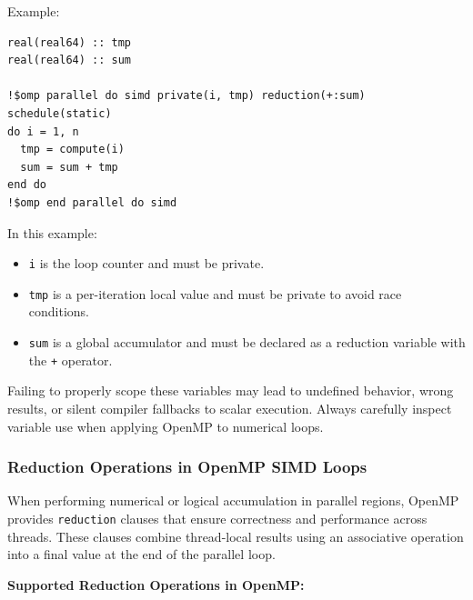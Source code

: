 \documentclass{article}
\begin{document}
\noindent
Example:
\begin{verbatim}
real(real64) :: tmp
real(real64) :: sum

!$omp parallel do simd private(i, tmp) reduction(+:sum) schedule(static)
do i = 1, n
  tmp = compute(i)
  sum = sum + tmp
end do
!$omp end parallel do simd
\end{verbatim}

In this example:
\begin{itemize}
  \item \texttt{i} is the loop counter and must be private.
  \item \texttt{tmp} is a per-iteration local value and must be private to avoid race conditions.
  \item \texttt{sum} is a global accumulator and must be declared as a reduction variable with the \texttt{+} operator.
\end{itemize}

Failing to properly scope these variables may lead to undefined behavior, wrong results, or silent compiler fallbacks to scalar execution. Always carefully inspect variable use when applying OpenMP to numerical loops.

\subsubsection{Reduction Operations in OpenMP SIMD Loops}

When performing numerical or logical accumulation in parallel regions, OpenMP provides \texttt{reduction} clauses that ensure correctness and performance across threads. These clauses combine thread-local results using an associative operation into a final value at the end of the parallel loop.

\vspace{1em}
\noindent
\textbf{Supported Reduction Operations in OpenMP:}
\end{document}
